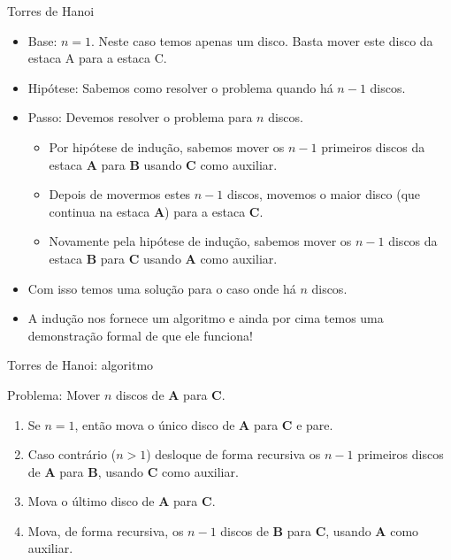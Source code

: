 \documentclass[handout]{beamer}
\begin{document}
\begin{frame}[fragile]{Torres de Hanoi}

    \begin{itemize}[<+->]
        \item Base: $n=1$. Neste caso temos apenas um disco. Basta mover este disco da estaca A para a estaca C.
        \item Hipótese: Sabemos como resolver o problema quando há $n-1$ discos.
        \item Passo: Devemos resolver o problema para $n$ discos.
        \begin{itemize}
            \item Por hipótese de indução, sabemos mover os $n-1$ primeiros discos da estaca {\bf A} para {\bf B} usando {\bf C} como auxiliar.
            \item Depois de movermos estes $n-1$ discos, movemos o maior disco (que continua na estaca {\bf A}) para a estaca {\bf C}.
            \item Novamente pela hipótese de indução, sabemos mover os $n-1$ discos da estaca {\bf B} para {\bf C} usando {\bf A} como auxiliar.
        \end{itemize}
        \item Com isso temos uma solução para o caso onde há $n$ discos.
        \item A indução nos fornece um algoritmo e ainda por cima temos uma demonstração formal de que ele funciona!
    \end{itemize}
\end{frame}

\begin{frame}[fragile]{Torres de Hanoi: algoritmo}

    Problema: Mover $n$ discos de {\bf A} para {\bf C}.

    \begin{enumerate}[<+->]
        \item Se $n=1$, então mova o único disco de {\bf A} para {\bf C} e pare.
        \item Caso contrário ($n > 1$) desloque de forma recursiva os $n-1$ primeiros discos de {\bf A} para {\bf B}, usando {\bf C} como auxiliar.
        \item Mova o último disco de {\bf A} para {\bf C}.
        \item Mova, de forma recursiva, os $n-1$ discos de {\bf B} para {\bf C}, usando {\bf A} como auxiliar.
    \end{enumerate}
\end{frame}
\end{document}
